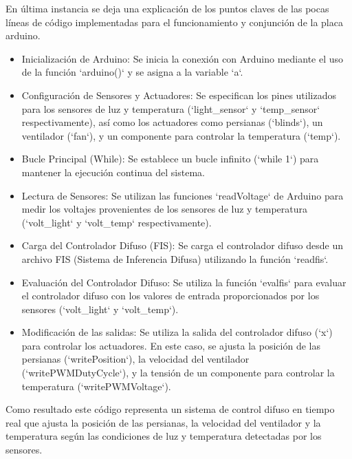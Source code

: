 \documentclass[a4paper, 12pt]{article}
\newcommand{\codeA}{code/fuzzyS.m}
\begin{document}
    
    En última instancia se deja una explicación de los puntos claves de las pocas líneas de código implementadas para el funcionamiento y conjunción de la placa arduino.

    \begin{itemize}

        \item Inicialización de Arduino: Se inicia la conexión con Arduino mediante el uso de la función `arduino()` y se asigna a la variable `a`.
        \item Configuración de Sensores y Actuadores: Se especifican los pines utilizados para los sensores de luz y temperatura (`light\_sensor` y `temp\_sensor` respectivamente), así como los actuadores como persianas (`blinds`), un ventilador (`fan`), y un componente para controlar la temperatura (`temp`).
        \item Bucle Principal (While): Se establece un bucle infinito (`while 1`) para mantener la ejecución continua del sistema.
        \item Lectura de Sensores: Se utilizan las funciones `readVoltage` de Arduino para medir los voltajes provenientes de los sensores de luz y temperatura (`volt\_light` y `volt\_temp` respectivamente).
        \item Carga del Controlador Difuso (FIS): Se carga el controlador difuso desde un archivo FIS (Sistema de Inferencia Difusa) utilizando la función `readfis`.
        \item Evaluación del Controlador Difuso: Se utiliza la función `evalfis` para evaluar el controlador difuso con los valores de entrada proporcionados por los sensores (`volt\_light` y `volt\_temp`).
        \item Modificación de las salidas: Se utiliza la salida del controlador difuso (`x`) para controlar los actuadores. En este caso, se ajusta la posición de las persianas (`writePosition`), la velocidad del ventilador (`writePWMDutyCycle`), y la tensión de un componente para controlar la temperatura (`writePWMVoltage`).
        
    \end{itemize}

    Como resultado este código representa un sistema de control difuso en tiempo real que ajusta la posición de las persianas, la velocidad del ventilador y la temperatura según las condiciones de luz y temperatura detectadas por los sensores.
    
\end{document}

